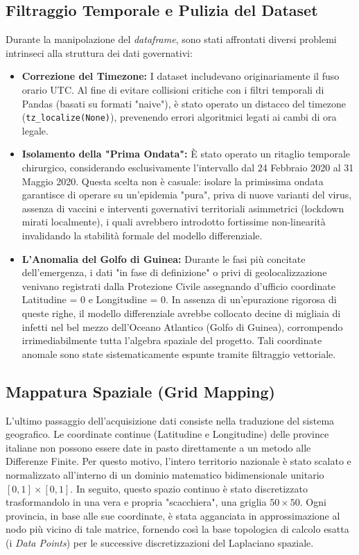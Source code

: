 \documentclass[12pt,a4paper]{article}
\begin{document}
\subsection{Filtraggio Temporale e Pulizia del Dataset}
Durante la manipolazione del \textit{dataframe}, sono stati affrontati diversi problemi intrinseci alla struttura dei dati governativi:
\begin{itemize}
    \item \textbf{Correzione del Timezone:} I dataset includevano originariamente il fuso orario UTC. Al fine di evitare collisioni critiche con i filtri temporali di Pandas (basati su formati "naive"), è stato operato un distacco del timezone (\texttt{tz\_localize(None)}), prevenendo errori algoritmici legati ai cambi di ora legale.
    \item \textbf{Isolamento della "Prima Ondata":} È stato operato un ritaglio temporale chirurgico, considerando esclusivamente l'intervallo dal 24 Febbraio 2020 al 31 Maggio 2020. Questa scelta non è casuale: isolare la primissima ondata garantisce di operare su un'epidemia "pura", priva di nuove varianti del virus, assenza di vaccini e interventi governativi territoriali asimmetrici (lockdown mirati localmente), i quali avrebbero introdotto fortissime non-linearità invalidando la stabilità formale del modello differenziale.
    \item \textbf{L'Anomalia del Golfo di Guinea:} Durante le fasi più concitate dell'emergenza, i dati "in fase di definizione" o privi di geolocalizzazione venivano registrati dalla Protezione Civile assegnando d'ufficio coordinate Latitudine = 0 e Longitudine = 0. In assenza di un'epurazione rigorosa di queste righe, il modello differenziale avrebbe collocato decine di migliaia di infetti nel bel mezzo dell'Oceano Atlantico (Golfo di Guinea), corrompendo irrimediabilmente tutta l'algebra spaziale del progetto. Tali coordinate anomale sono state sistematicamente espunte tramite filtraggio vettoriale.
\end{itemize}

\subsection{Mappatura Spaziale (Grid Mapping)}
L'ultimo passaggio dell'acquisizione dati consiste nella traduzione del sistema geografico. Le coordinate continue (Latitudine e Longitudine) delle province italiane non possono essere date in pasto direttamente a un metodo alle Differenze Finite. Per questo motivo, l'intero territorio nazionale è stato scalato e normalizzato all'interno di un dominio matematico bidimensionale unitario $[0, 1] \times [0, 1]$. In seguito, questo spazio continuo è stato discretizzato trasformandolo in una vera e propria "scacchiera", una griglia $50 \times 50$. Ogni provincia, in base alle sue coordinate, è stata agganciata in approssimazione al nodo più vicino di tale matrice, fornendo così la base topologica di calcolo esatta (i \textit{Data Points}) per le successive discretizzazioni del Laplaciano spaziale.
\end{document}
